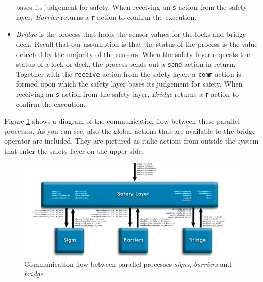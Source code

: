 \begin{itemize}
	bases its judgement for safety. When receiving an \texttt{s}-action from the safety layer, \emph{Barrier} returns a \texttt{r}-action to confirm the execution.
	\item \emph{Bridge} is the process that holds the sensor values for the locks and bridge deck. Recall that our assumption is that the status of the process is the value detected by the majority of the sensors. When the
	safety layer requests the status of a lock or deck, the process sends out a \texttt{send}-action in return. Together with the \texttt{receive}-action from the safety layer, a \texttt{comm}-action is formed upon which the safety
	layer 	bases its judgement for safety. When receiving an \texttt{s}-action from the safety layer, \emph{Bridge} returns a \texttt{r}-action to confirm the execution.
\end{itemize}
%
Figure \ref{fig:arch} shows a diagram of the communication flow between these parallel processes. As you can see, also the global actions that are available to the bridge operator are included. They are pictured as italic actions from outside the system that enter the safety layer on the upper side.
%
\begin{figure}[htb]%
\centering
\includegraphics[width=\columnwidth]{Images/Architecture_2}%
\caption{Communication flow between parallel processes \emph{signs}, \emph{barriers} and \emph{bridge}.}%
\label{fig:arch}%
\end{figure}
%

